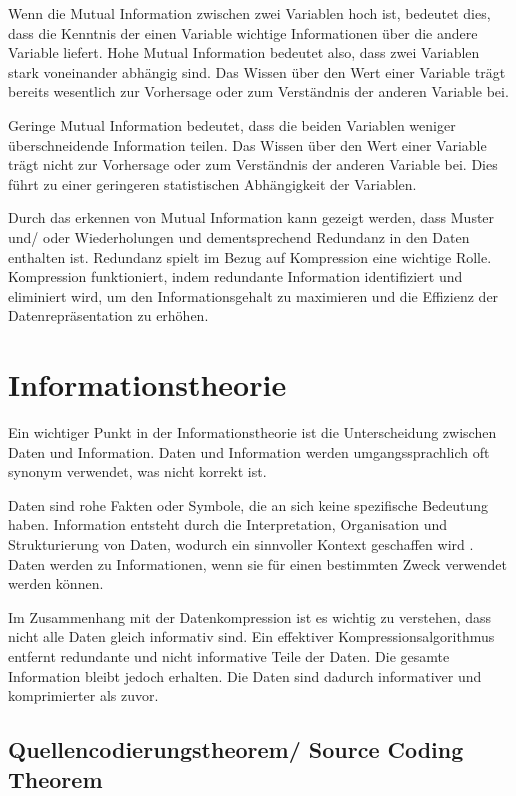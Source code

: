 \documentclass[conference]{IEEEtran}
\begin{document}
Wenn die Mutual Information zwischen zwei Variablen hoch ist, bedeutet dies, dass die 
Kenntnis der einen Variable wichtige Informationen über die andere Variable liefert.
Hohe Mutual Information bedeutet also, dass zwei Variablen stark voneinander 
abhängig sind.
Das Wissen über den Wert einer Variable trägt bereits wesentlich zur Vorhersage
oder zum Verständnis der anderen Variable bei.

Geringe Mutual Information bedeutet, dass die beiden Variablen weniger überschneidende 
Information teilen.
Das Wissen über den Wert einer Variable trägt nicht zur
Vorhersage oder zum Verständnis der anderen Variable bei.
Dies führt zu einer geringeren statistischen Abhängigkeit der Variablen.

Durch das erkennen von Mutual Information kann gezeigt werden, dass Muster und/ oder
Wiederholungen und dementsprechend Redundanz in den Daten enthalten ist.
Redundanz spielt im Bezug auf Kompression eine wichtige Rolle.
Kompression funktioniert, indem redundante Information identifiziert und eliminiert 
wird, um den Informationsgehalt zu maximieren und die Effizienz der Datenrepräsentation 
zu erhöhen.


\section{Informationstheorie}

Ein wichtiger Punkt in der Informationstheorie ist die Unterscheidung zwischen 
Daten und Information. 
Daten und Information werden umgangssprachlich oft synonym verwendet, was 
nicht korrekt ist. 

Daten sind rohe Fakten oder Symbole, die an sich keine spezifische Bedeutung haben.
Information entsteht durch die Interpretation, Organisation und Strukturierung von Daten, 
wodurch ein sinnvoller Kontext geschaffen wird \cite{pieper}. 
Daten werden zu Informationen, wenn sie für einen bestimmten Zweck verwendet werden können.

Im Zusammenhang mit der Datenkompression ist es wichtig zu verstehen, dass 
nicht alle Daten gleich informativ sind. 
Ein effektiver Kompressionsalgorithmus entfernt redundante und nicht informative 
Teile der Daten. 
Die gesamte Information bleibt jedoch erhalten. 
Die Daten sind dadurch informativer und komprimierter als zuvor.

\subsection{Quellencodierungstheorem/ Source Coding Theorem}
\end{document}
